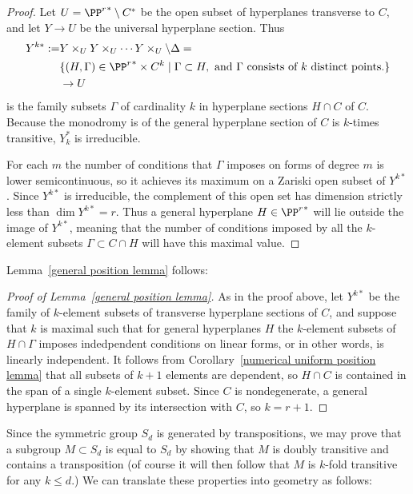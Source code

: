 \begin{proof} Let $U = {\PP^r}^* \setminus C^*$ be the open subset of hyperplanes transverse to $C$, and let $Y\to U$ be the universal hyperplane section.
Thus
\begin{align*}
 Y^{k*} :=&Y\times_U Y\times_U \cdots Y\times_U \setminus \Delta  =\\
                                                 & \{ (H, \Gamma) \in {\PP^r}^* \times C^k \mid \Gamma \subset H, \hbox{ and $\Gamma$ consists of $k$ distinct points.}\}\\
                                                 &\to U
\end{align*}
is the family subsets $\Gamma$ of cardinality $k$ in hyperplane sections $H \cap C$ of $C$. Because the monodromy is of the general hyperplane section of $C$ is
$k$-times transitive, $Y_k^*$ is irreducible.

For each $m$ the number of conditions that $\Gamma$ imposes on forms of degree $m$ is lower semicontinuous, so it achieves its maximum on a Zariski open subset of $Y^{k*}$. Since $Y^{k*}$ is irreducible, the complement of this open set has dimension strictly less than $\dim Y^{k*} = r$. Thus a general hyperplane $H \in {\PP^r}^*$ will lie outside the image of $Y^{k*}$, meaning that the number of conditions imposed by all the $k$-element subsets $\Gamma \subset C \cap H$ will have this maximal value.
\end{proof}

Lemma~\ref{general position lemma} follows:

\begin{proof}[Proof of Lemma~\ref{general position lemma}] As in the proof above, let $Y^{k*}$ be the family of $k$-element subsets
of transverse hyperplane sections of $C$, and suppose that $k$ is maximal such that for general hyperplanes $H$ the
$k$-element subsets of $H\cap \Gamma$ imposes indedpendent conditions on linear forms, or in other words, is linearly independent.
It follows from Corollary~\ref{numerical uniform position lemma} that all subsets of $k+1$ elements are dependent, so $H\cap C$ is
contained in the span of a single $k$-element subset. Since $C$ is nondegenerate, a general hyperplane is spanned
by its intersection with $C$, so $k=r+1$.
\end{proof}

Since the symmetric group $S_d$ is generated by transpositions, we may prove that a subgroup $M\subset S_d$ is equal to $S_d$ by showing that $M$ is doubly transitive and contains a transposition (of course it will then follow that $M$ is $k$-fold transitive for any $k\leq d$.) We can translate these properties into geometry as follows:

